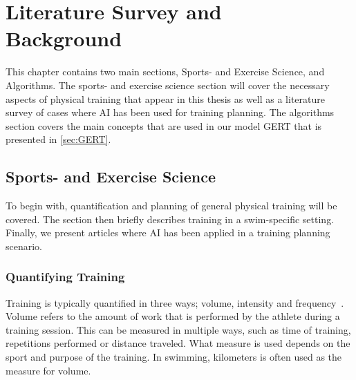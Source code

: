 

\chapter[Literature Survey and Background]{Literature Survey and\\Background}
\label{sec:background}
This chapter contains two main sections, Sports- and Exercise Science, and Algorithms.
The sports- and exercise science section will cover the necessary aspects of physical training that appear in this thesis as well as a literature survey of cases where AI has been used for training planning.
The algorithms section covers the main concepts that are used in our model GERT that is presented in \cref{sec:GERT}.

\section{Sports- and Exercise Science}
To begin with, quantification and planning of general physical training will be covered.
The section then briefly describes training in a swim-specific setting.
Finally, we present articles where AI has been applied in a training planning scenario.

\subsection{Quantifying Training}
Training is typically quantified in three ways; volume, intensity and frequency~\cite{smith2003framework}.
Volume refers to the amount of work that is performed by the athlete during a training session.
This can be measured in multiple ways, such as time of training, repetitions performed or distance traveled. 
What measure is used depends on the sport and purpose of the training.
In swimming, kilometers is often used as the measure for volume.

